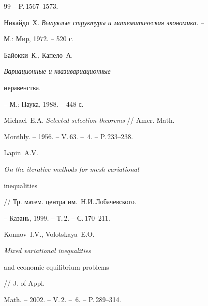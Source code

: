 \begin{thebibliography}{99}
-- P.\,1567--1573.







Никайдо~Х. {\it Выпуклые структуры и математическая экономика.} --


М.: Мир, 1972. -- 520 с.







Байокки~К., Капело~А. {\it Вариационные и квазивариационные


неравенства.} -- М.: Наука, 1988. -- 448 с.







Michael~E.A. {\it Selected selection theorems} // Amer. Math.


Monthly. -- 1956. -- V.\,63. -- \No\,4. -- P.\,233--238.







Lapin~A.V. {\it On the iterative methods for mesh variational


inequalities} // Тр. матем. центра им.~Н.И.\,Лобачевского.


-- Казань, 1999. -- Т.\,2. -- С.\,170--211.







Konnov~I.V., Volotskaya~E.O. {\em Mixed variational inequalities


and economic equilibrium problems} // J. of Appl.


Math. -- 2002. -- V.\,2. -- \No\,6. -- P.\,289--314.





\end{thebibliography}





\vskip 2cm












\label{end}





